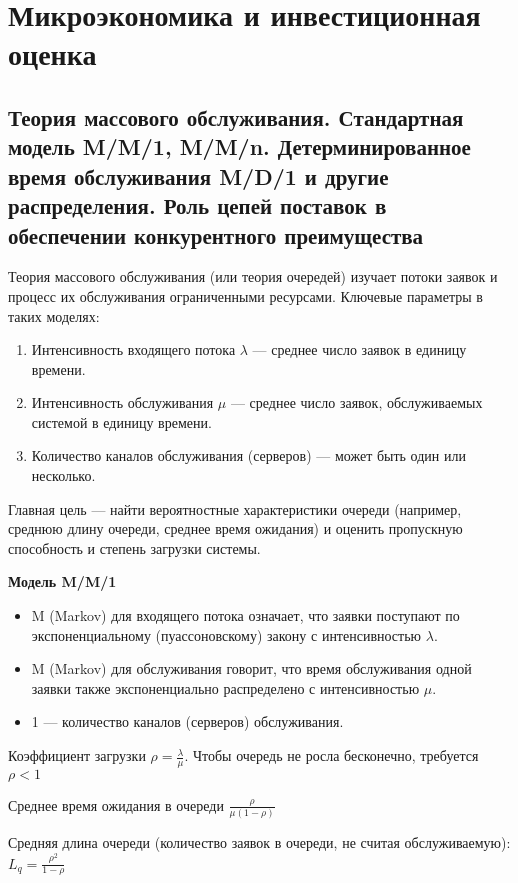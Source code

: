 \section{Микроэкономика и инвестиционная оценка}

\subsection{Теория массового обслуживания. Стандартная модель M/M/1, M/M/n. Детерминированное время обслуживания M/D/1 и другие распределения. Роль цепей поставок в обеспечении конкурентного преимущества}

Теория массового обслуживания (или теория очередей) изучает потоки заявок и процесс их обслуживания ограниченными ресурсами. Ключевые параметры в таких моделях:
\begin{enumerate}
    \item Интенсивность входящего потока $\lambda$ --- среднее число заявок в единицу времени.
    \item Интенсивность обслуживания $\mu$ --- среднее число заявок, обслуживаемых системой в единицу времени.
    \item Количество каналов обслуживания (серверов) --- может быть один или несколько.
\end{enumerate}

Главная цель --- найти вероятностные характеристики очереди (например, среднюю длину очереди, среднее время ожидания) и оценить пропускную способность и степень загрузки системы.

\textbf{Модель M/M/1}

\begin{itemize}
    \item M (Markov) для входящего потока означает, что заявки поступают по экспоненциальному (пуассоновскому) закону с интенсивностью $\lambda$.
    \item M (Markov) для обслуживания говорит, что время обслуживания одной заявки также экспоненциально распределено с интенсивностью $\mu$.
    \item 1 --- количество каналов (серверов) обслуживания.
\end{itemize}

Коэффициент загрузки $\rho = \frac{\lambda}{\mu}$. Чтобы очередь не росла бесконечно, требуется $\rho < 1$

Среднее время ожидания в очереди $\frac{\rho}{\mu (1 - \rho)}$

Средняя длина очереди (количество заявок в очереди, не считая обслуживаемую): $L_q = \frac{\rho ^ 2}{1 - \rho}$

